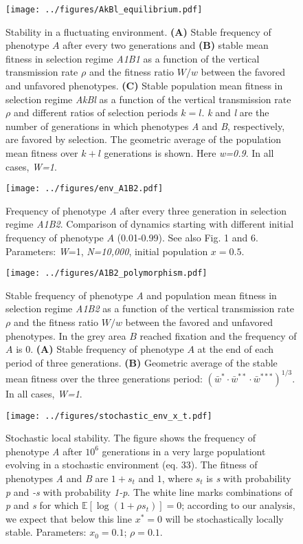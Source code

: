 \documentclass[]{article}
\begin{document}
\begin{figure}
\centering
\texttt{[image: ../figures/AkBl\_equilibrium.pdf]}
\caption{Stability in a fluctuating environment.
\textbf{(A)} Stable frequency of phenotype $A$ after every two generations and \textbf{(B)} stable mean fitness in selection regime \emph{A1B1} as a function of the vertical transmission rate \(\rho\) and the fitness ratio \(W/w\) between the favored and unfavored phenotypes.
\textbf{(C)} Stable population mean fitness in selection regime \emph{AkBl} as a
function of the vertical transmission rate \(\rho\) and different ratios of selection periods \(k=l\). \emph{k} and \emph{l} are the number of generations in which phenotypes \emph{A} and \emph{B}, respectively, are favored by selection.
The geometric average of the population mean fitness over $k+l$ generations is shown. 
Here \emph{w=0.9}.
In all cases, \emph{W=1}.
}\label{fig:AkBl_equilibrium}
\end{figure}

\begin{figure}
\centering
\texttt{[image: ../figures/env\_A1B2.pdf]}
\caption{Frequency of phenotype \emph{A} after every three generation in
selection regime \emph{A1B2}. Comparison of dynamics starting with
different initial frequency of phenotype \(A\) (0.01-0.99).
See also Fig. 1 and 6. Parameters: \emph{W}=1, \emph{N=10,000},
initial population \(x=0.5\).}\label{fig:env_A1B2}
\end{figure}

\begin{figure}
\centering
\texttt{[image: ../figures/A1B2\_polymorphism.pdf]}
\caption{Stable frequency of phenotype \emph{A} and population mean fitness in selection regime
\emph{A1B2} as a function of the vertical transmission rate \(\rho\) and the fitness ratio \(W/w\) between the favored and unfavored phenotypes.
In the grey area \(B\) reached fixation and the frequency of \(A\) is 0.
\textbf{(A)} Stable frequency of phenotype $A$ at the end of each period of three generations.
\textbf{(B)} Geometric average of the stable mean fitness over the three generations period: $(\bar{w}^* \cdot \bar{w}^{**} \cdot \bar{w}^{***})^{1/3}$.
In all cases, \emph{W=1}.}\label{fig:A1B2_polymorphism}
\end{figure}

\begin{figure}
\centering
\texttt{[image: ../figures/stochastic\_env\_x\_t.pdf]}
\caption{Stochastic local stability. The figure shows the frequency of
phenotype \emph{A} after \(10^6\) generations in a very large populationt 
evolving in a stochastic environment (eq. 33). The
fitness of phenotypes \emph{A} and \emph{B} are \(1+s_t\) and \(1\),
where \(s_t\) is \emph{s} with probability \emph{p} and \emph{-s} with
probability \emph{1-p}. The white line marks combinations of \emph{p}
and \emph{s} for which \(\mathbb{E}[\log{(1+\rho s_t)}]=0\); according
to our analysis, we expect that below this line \(x^*=0\) will be
stochastically locally stable. Parameters: \(x_0=0.1\);
\(\rho=0.1\).}\label{fig:stochastic_env_x_t}
\end{figure}
\end{document}
